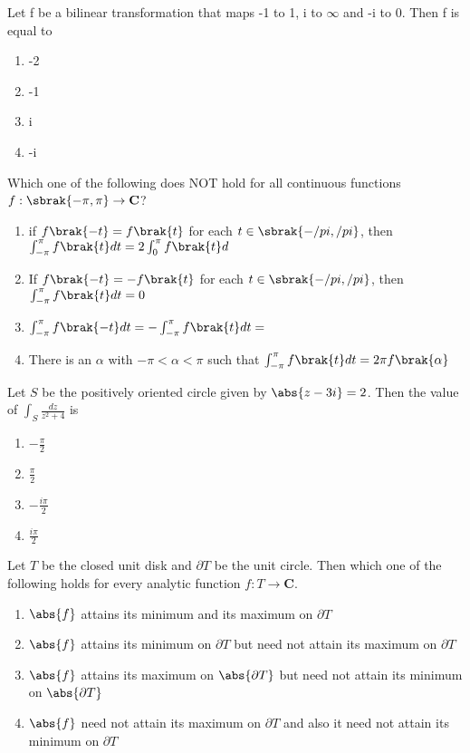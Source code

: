 \item Let f be a bilinear transformation that maps -1 to 1, i to $\infty$ and -i to 0. Then f is equal to
\begin{enumerate}
\item -2
\item -1
\item i
\item -i
\end{enumerate}
\item Which one of the following does NOT hold for all continuous functions $f:\sbrak{-\pi,\pi}\rightarrow\mathbf{C}$?
\begin{enumerate}
\item if $f\brak{-t}=f\brak{t}$ for each $t \in \sbrak{-/pi,/pi}$, then $\int_{-\pi}^\pi f\brak{t} dt=2\int_{0}^\pi f\brak{t} d$
\item If $f\brak{-t}=-f\brak{t}$ for each $t \in \sbrak{-/pi,/pi}$, then $\int_{-\pi}^\pi f\brak{t} dt=0$
\item $\int_{-\pi}^\pi f\brak{-t} dt=-\int_{-\pi}^\pi f\brak{t} dt=$
\item There is an $\alpha$ with $-\pi<\alpha<\pi$ such that $\int_{-\pi}^\pi f\brak{t} dt= 2\pi f\brak{\alpha}$
\end{enumerate}
    \item Let  $S$ be the positively oriented circle given by $\abs{z - 3i} = 2 $. Then the value of $\int_{S} \frac{dz}{z^2 + 4}$ is
    \begin{enumerate}
        \item $-\frac{\pi}{2} $
        \item $ \frac{\pi}{2} $
        \item $ -\frac{i\pi}{2} $
        \item $ \frac{i\pi}{2} $
    \end{enumerate}
    \item Let $T$ be the closed unit disk and $\partial T$ be the unit circle. Then which one of the following holds for every analytic function $f : T \to \mathbf{C} $.
    \begin{enumerate}
        \item $\abs{f}$ attains its minimum and its maximum on $\partial T$
        \item $\abs{f}$ attains its minimum on $\partial T$ but need not attain its maximum on $\partial T$
        \item $\abs{f}$ attains its maximum on $\abs{ \partial T}$ but need not attain its minimum on $\abs{ \partial T }$
        \item $\abs{f}$ need not attain its maximum on  $\partial T$ and also it need not attain its minimum on $\partial T$
    \end{enumerate}
